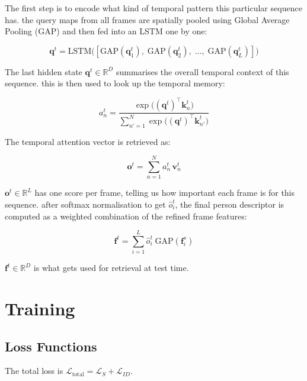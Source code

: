 \documentclass[conference]{IEEEtran}
\begin{document}
The first step is to encode what kind of temporal pattern this particular sequence has. the query maps from all frames are spatially pooled using Global Average Pooling (GAP) and then fed into an LSTM one by one:

\begin{equation}
    \mathbf{q}^t = \mathrm{LSTM}\bigl([\mathrm{GAP}(\mathbf{q}^t_1),\; \mathrm{GAP}(\mathbf{q}^t_2),\; \ldots,\; \mathrm{GAP}(\mathbf{q}^t_L)]\bigr)
    \label{eq:lstm}
\end{equation}

The last hidden state $\mathbf{q}^t \in \mathbb{R}^D$ summarises the overall temporal context of this sequence. this is then used to look up the temporal memory:

\begin{equation}
    a^t_n = \frac{\exp\bigl((\mathbf{q}^t)^\top \mathbf{k}^t_n\bigr)}{\sum_{n'=1}^{N} \exp\bigl((\mathbf{q}^t)^\top \mathbf{k}^t_{n'}\bigr)}
    \label{eq:tm_attn}
\end{equation}

The temporal attention vector is retrieved as:

\begin{equation}
    \mathbf{o}^t = \sum_{n=1}^{N} a^t_n\, \mathbf{v}^t_n
    \label{eq:tm_out}
\end{equation}

$\mathbf{o}^t \in \mathbb{R}^L$ has one score per frame, telling us how important each frame is for this sequence. after softmax normalisation to get $\hat{o}^t_i$, the final person descriptor is computed as a weighted combination of the refined frame features:

\begin{equation}
    \mathbf{f}^t = \sum_{i=1}^{L} \hat{o}^t_i\; \mathrm{GAP}(\mathbf{f}^s_i)
    \label{eq:final}
\end{equation}

$\mathbf{f}^t \in \mathbb{R}^D$ is what gets used for retrieval at test time.

\section{Training}
\label{sec:train}

\subsection{Loss Functions}

The total loss is $\mathcal{L}_\text{total} = \mathcal{L}_S + \mathcal{L}_{ID}$.
\end{document}
